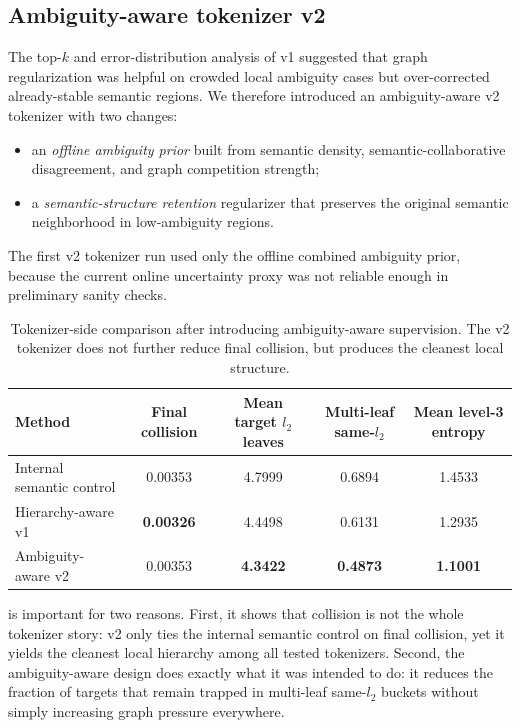 \subsection{Ambiguity-aware tokenizer v2}

The top-$k$ and error-distribution analysis of v1 suggested that graph regularization was helpful on crowded local ambiguity cases but over-corrected already-stable semantic regions. We therefore introduced an ambiguity-aware v2 tokenizer with two changes:
\begin{itemize}[leftmargin=1.4em]
  \item an \emph{offline ambiguity prior} built from semantic density, semantic-collaborative disagreement, and graph competition strength;
  \item a \emph{semantic-structure retention} regularizer that preserves the original semantic neighborhood in low-ambiguity regions.
\end{itemize}

The first v2 tokenizer run used only the offline combined ambiguity prior, because the current online uncertainty proxy was not reliable enough in preliminary sanity checks.

\begin{table}[t]
  \centering
  \caption{Tokenizer-side comparison after introducing ambiguity-aware supervision. The v2 tokenizer does not further reduce final collision, but produces the cleanest local structure.}
  \label{tab:v2tok}
  \begin{tabular}{lcccc}
    \toprule
    Method & Final collision & Mean target $l_2$ leaves & Multi-leaf same-$l_2$ & Mean level-3 entropy \\
    \midrule
    Internal semantic control & 0.00353 & 4.7999 & 0.6894 & 1.4533 \\
    Hierarchy-aware v1 & \textbf{0.00326} & 4.4498 & 0.6131 & 1.2935 \\
    Ambiguity-aware v2 & 0.00353 & \textbf{4.3422} & \textbf{0.4873} & \textbf{1.1001} \\
    \bottomrule
  \end{tabular}
\end{table}

 is important for two reasons. First, it shows that collision is not the whole tokenizer story: v2 only ties the internal semantic control on final collision, yet it yields the cleanest local hierarchy among all tested tokenizers. Second, the ambiguity-aware design does exactly what it was intended to do: it reduces the fraction of targets that remain trapped in multi-leaf same-$l_2$ buckets without simply increasing graph pressure everywhere.

